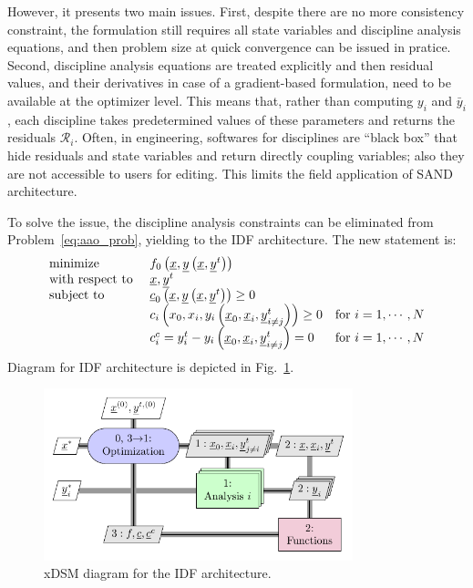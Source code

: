 However, it presents two main issues. 
First, despite there are no more consistency constraint, the formulation still requires all state variables and discipline analysis equations, and then problem size at quick convergence can be issued in pratice. 
Second, discipline analysis equations are treated explicitly and then residual values, and their derivatives in case of a gradient-based formulation, need to be available at the optimizer level. 
This means that, rather than computing $y_i$ and $\bar{y}_i$, each discipline takes predetermined values of these parameters and returns the residuals $\mathcal{R}_i$. 
Often, in engineering, softwares for disciplines are ``black box'' that hide residuals and state variables and return directly coupling variables; also they are not accessible to users for editing. 
This limits the field application of SAND architecture. 

To solve the issue, the discipline analysis constraints can be eliminated from Problem~\eqref{eq:aao_prob}, yielding to the IDF architecture. 
The new statement is:
\begin{equation}
\label{eq:idf_prob}
\begin{array}{l l l}
\textrm{minimize } & f_0\left(\underline{x},\underline{y}\left(\underline{x}, \underline{y}^t\right)\right) & \\
\textrm{with respect to } & \underline{x}, \underline{y}^t & \\
\textrm{subject to } & \underline{c}_0\left(\underline{x}, \underline{y}\left(\underline{x}, \underline{y}^t\right)\right)\geq 0 & \\
& c_i\left(x_0, x_i, y_i\left(\underline{x}_0, \underline{x}_i, \underline{y}_{i\neq j}^t\right)\right) \geq 0 & \textrm{for } i=1,\cdots,N \\
& c_i^c = y_i^t - y_i\left(\underline{x}_0, \underline{x}_i, \underline{y}_{i\neq j}^t\right) = 0 & \textrm{for } i=1,\cdots,N \\	
\end{array}
\end{equation}
Diagram for IDF architecture is depicted in Fig.~\ref{fig:idf_arch}. 
\begin{figure}[!h]
	\centering
	\includegraphics[keepaspectratio, width=0.8\textwidth]{images/app_mdo/IDF}
	\caption{xDSM diagram for the IDF architecture.}
	\label{fig:idf_arch}
\end{figure}

